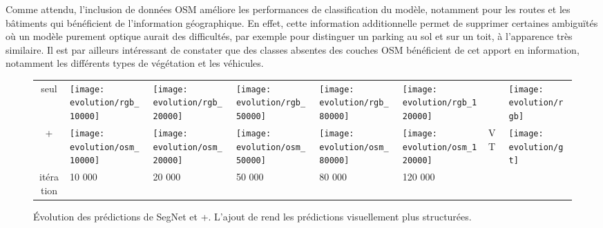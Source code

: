 Comme attendu, l'inclusion de données \gls{OSM} améliore les performances de classification du modèle, notamment pour les routes et les bâtiments qui bénéficient de l'information géographique. En effet, cette information additionnelle permet de supprimer certaines ambiguïtés où un modèle purement optique aurait des difficultés, par exemple pour distinguer un parking au sol et sur un toit, à l'apparence très similaire. Il est par ailleurs intéressant de constater que des classes absentes des couches \gls{OSM} bénéficient de cet apport en information, notamment les différents types de végétation et les véhicules.

\begin{figure}
\centering
\begin{tabularx}{0.95\textwidth}{c Y Y Y Y Y Y Y}
 seul &
\texttt{[image: evolution/rgb\_10000]} &
\texttt{[image: evolution/rgb\_20000]} &
\texttt{[image: evolution/rgb\_50000]} &
\texttt{[image: evolution/rgb\_80000]} &
\texttt{[image: evolution/rgb\_120000]} &
 &
\texttt{[image: evolution/rgb]} \\
 +  &
\texttt{[image: evolution/osm\_10000]} &
\texttt{[image: evolution/osm\_20000]} &
\texttt{[image: evolution/osm\_50000]} &
\texttt{[image: evolution/osm\_80000]} &
\texttt{[image: evolution/osm\_120000]} &
VT &
\texttt{[image: evolution/gt]} \\
itération & 10 000 & 20 000 & 50 000 & 80 000 & 120 000\\
\end{tabularx}
\caption[Évolution des prédictions de SegNet  et +.]{Évolution des prédictions de SegNet  et +. L'ajout de  rend les prédictions visuellement plus structurées.\\
\isprslegende}
\label{fig:training_evolution}
\end{figure}

